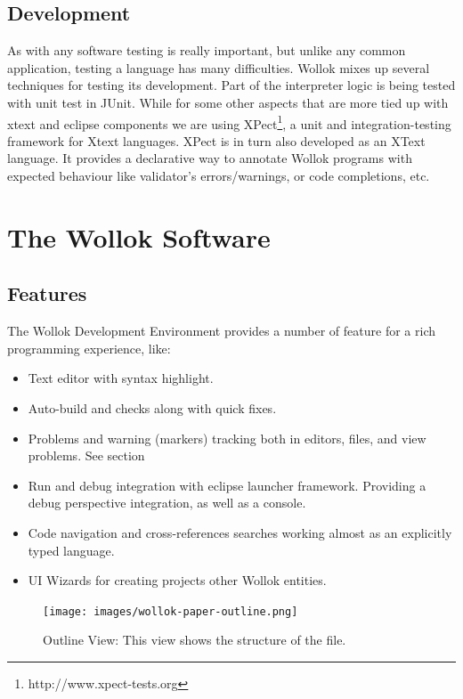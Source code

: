 \subsection{Development}
As with any software testing is really important, but unlike any common application, testing a language has many difficulties.
Wollok mixes up several techniques for testing its development.
Part of the interpreter logic is being tested with unit test in JUnit. While for some other aspects that are more tied up with xtext and eclipse components we are using XPect\footnote{http://www.xpect-tests.org}, a unit and integration-testing framework for Xtext languages.
XPect is in turn also developed as an XText language.
It provides a declarative way to annotate Wollok programs with expected
behaviour like validator’s errors/warnings, or code completions,  etc.

\section{The Wollok Software}

\subsection{Features}
The Wollok Development Environment provides a number of feature for a rich programming experience, like:

\begin{itemize}
 \item Text editor with syntax highlight.
 \item Auto-build and checks along with quick fixes.
 \item Problems and warning (markers) tracking both in editors, files, and view problems. See section 
 \item Run and debug integration with eclipse launcher framework. Providing a debug perspective integration, as well as a console.
 \item Code navigation and cross-references searches working almost as an explicitly typed language.
 \item UI Wizards for creating projects other Wollok entities.
\end{itemize}


\begin{figure}[ht]
    \centering
	\texttt{[image: images/wollok-paper-outline.png]}
    \caption{Outline View: This view shows the structure of the file.}
    \label{fig:outline.png}
\end{figure}

